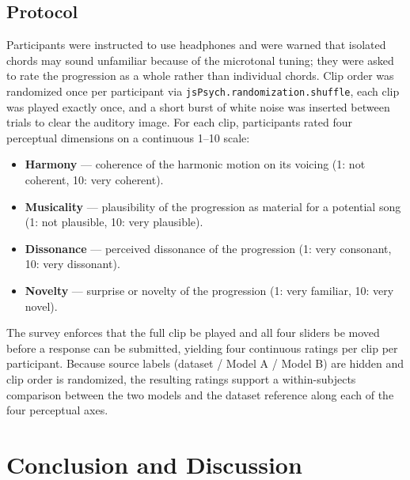 \documentclass{aimc2026}
\begin{document}
\subsection{Protocol}

Participants were instructed to use headphones and were warned that isolated chords may sound unfamiliar because of the microtonal tuning; they were asked to rate the progression as a whole rather than individual chords. Clip order was randomized once per participant via \texttt{jsPsych.randomization.shuffle}, each clip was played exactly once, and a short burst of white noise was inserted between trials to clear the auditory image. For each clip, participants rated four perceptual dimensions on a continuous 1--10 scale:

\begin{itemize}
  \item \textbf{Harmony} --- coherence of the harmonic motion on its voicing (1: not coherent, 10: very coherent).
  \item \textbf{Musicality} --- plausibility of the progression as material for a potential song (1: not plausible, 10: very plausible).
  \item \textbf{Dissonance} --- perceived dissonance of the progression (1: very consonant, 10: very dissonant).
  \item \textbf{Novelty} --- surprise or novelty of the progression (1: very familiar, 10: very novel).
\end{itemize}

The survey enforces that the full clip be played and all four sliders be moved before a response can be submitted, yielding four continuous ratings per clip per participant. Because source labels (dataset / Model A / Model B) are hidden and clip order is randomized, the resulting ratings support a within-subjects comparison between the two models and the dataset reference along each of the four perceptual axes.






\section{Conclusion and Discussion}
\label{sec:conclusion}
\end{document}
